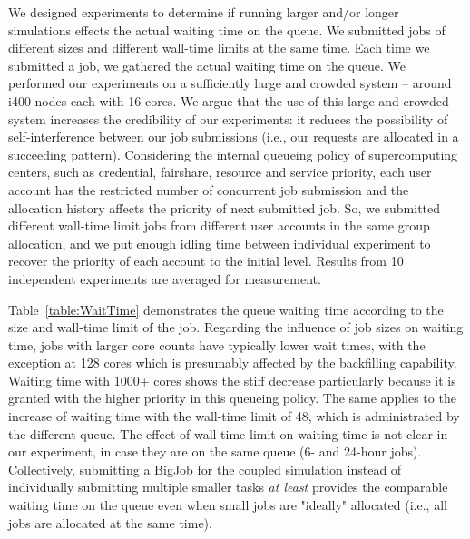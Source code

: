 \documentclass[preprint,12pt]{elsarticle}
\begin{document}
We designed experiments to determine if running larger and/or longer simulations effects
the actual waiting time on the queue. 
We submitted jobs of different sizes and different wall-time limits at the same time.
Each time we submitted a job, we gathered the actual waiting time on the queue.
We performed our experiments on a sufficiently large and 
crowded system -- around i400 nodes each with 16 cores.
We argue that the use of this large and crowded system increases 
the credibility of our experiments: it reduces the possibility of
self-interference between our job submissions 
(i.e., our requests are allocated in a succeeding pattern).
Considering the internal queueing policy of supercomputing centers,
such as credential, fairshare, resource and service priority,
each user account has the restricted number of concurrent job submission
and the allocation history affects the priority of next submitted job.
So, we submitted different wall-time limit jobs 
from different user accounts in the same group allocation,
and we put enough idling time between individual experiment
to recover the priority of each account to the initial level.
Results from 10 independent experiments are averaged for measurement.

Table~\ref{table:WaitTime} demonstrates the queue waiting time
according to the size and wall-time limit of the job.
Regarding the influence of job sizes on waiting time,
jobs with larger core counts have typically lower wait times,
with the exception at 128 cores which is presumably affected by
the backfilling capability. Waiting time with 1000+ cores shows
the stiff decrease particularly because it is granted with
the higher priority in this queueing policy. The same applies to
the increase of waiting time with the wall-time limit of 48,
which is administrated by the different queue. The effect of
wall-time limit on waiting time is not clear in our experiment,
in case they are on the same queue (6- and 24-hour jobs).
Collectively, submitting a BigJob for the coupled simulation
instead of individually submitting multiple smaller tasks
\textit{at least} provides the comparable waiting time on the queue
even when small jobs are "ideally" allocated
(i.e., all jobs are allocated at the same time).
\end{document}
